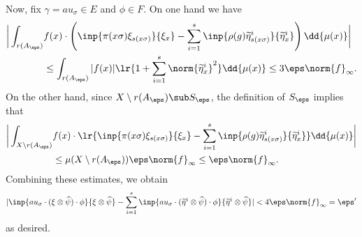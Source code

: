 \documentclass[../main.tex]{subfiles}
\begin{document}
    Now, fix $ \gamma = au_{\sigma}\in E $ and $ \phi\in F $. On one hand we have 
    \begin{align*}
        \bigg|\int_{r(A_{\eps})}& f(x)\cdot \left(\inp{\pi(x \sigma) \xi_{s(x \sigma)}}{\xi_{x}} - \sum_{i=1}^{s} \inp{\rho(g) \widetilde{\eta}^{i}_{s(x \sigma)}}{\widetilde{\eta}^{i}_{x}}\right)\dd{\mu(x)}\bigg|  \\
        &\leq \int_{r(A_{\eps})}|f(x)| \lr{1 + \sum_{i=1}^{s} \norm{\widetilde{\eta}^{i}_{x}}^{2}} \dd{\mu(x)} \leq 3 \eps \norm{f}_{\infty}.
    \end{align*}
    On the other hand, since $ X\setminus r(A_{\eps}) \sub S_{\eps} $, the definition of $ S_{\eps} $ implies that
    \begin{align*}
        \bigg|\int_{X\setminus r(A_{\eps})}& f(x)\cdot \lr{\inp{\pi(x \sigma) \xi_{s(x \sigma)}}{\xi_{x}} - \sum_{i=1}^{s} \inp{\rho(g) \widetilde{\eta}^{i}_{s(x \sigma)}}{\widetilde{\eta}^{i}_{x}}}\dd{\mu(x)}\bigg|  \\
        &\leq  \mu(X\setminus r(A_{\eps})) \eps \norm{f}_{\infty} \leq \eps\norm{f}_{\infty}.
    \end{align*}
    Combining these estimates, we obtain
    \begin{align*}
        |\inp{au_{\sigma}\cdot (\xi \otimes \widehat{\psi})\cdot \phi}{\xi \otimes \widehat{\psi}} - \sum_{i=1}^{s} \inp{au_{\sigma}\cdot (\widetilde{\eta}^{i} \otimes \widehat{\psi})\cdot \phi}{\widetilde{\eta}^{i} \otimes \widehat{\psi}} | < 4 \eps \norm{f}_{\infty} = \eps^{\prime}
    \end{align*}
    as desired.\\
\end{document}
